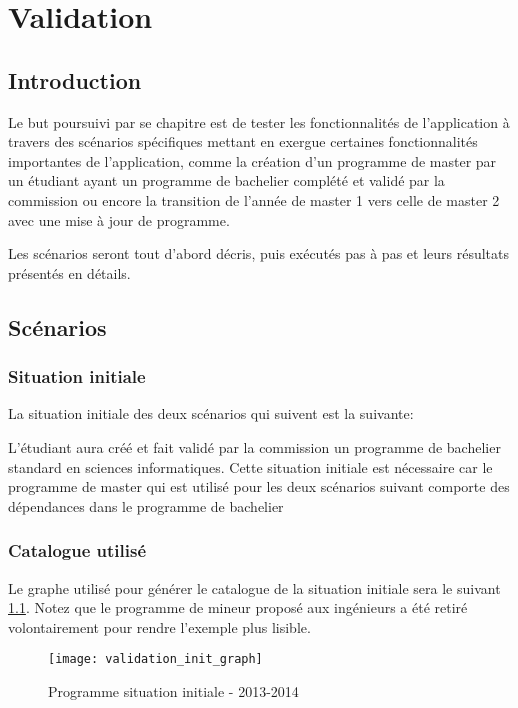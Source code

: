 \chapter{Validation}
\label{validation}
\section{Introduction}
\label{introduction_val}
Le but poursuivi par se chapitre est de tester les fonctionnalités de l'application à travers des scénarios spécifiques mettant en exergue certaines fonctionnalités importantes de l'application, comme la création d'un programme de master par un étudiant ayant un programme de bachelier complété et validé par la commission ou encore la transition de l'année de master 1 vers celle de master 2 avec une mise à jour de programme. 

Les scénarios seront tout d'abord décris, puis exécutés pas à pas et leurs résultats présentés en détails. 

\section{Scénarios}
\subsection{Situation initiale}
La situation initiale des deux scénarios qui suivent est la suivante:

L'étudiant aura créé et fait validé par la commission un programme de bachelier standard en sciences informatiques. Cette situation initiale est nécessaire car le programme de master qui est utilisé pour les deux scénarios suivant comporte des dépendances dans le programme de bachelier

\subsection{Catalogue utilisé}
Le graphe utilisé pour générer le catalogue de la situation initiale sera le suivant \ref{fig:situation_initiale}. Notez que le programme de mineur proposé aux ingénieurs a été retiré volontairement pour rendre l'exemple plus lisible.
\begin{figure}
\centering
\caption{Programme situation initiale - 2013-2014}
\label{fig:situation_initiale}
\texttt{[image: validation\_init\_graph]}
\end{figure}

